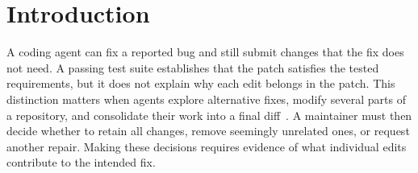 \documentclass[a4paper,fleqn]{cas-sc}
\newcommand{\dsl}{\textsc{Shift-Intent}}
\begin{document}







\section{Introduction}\label{sec:introduction}

A coding agent can fix a reported bug and still submit changes that the fix does not need. A passing test suite establishes that the patch satisfies the tested requirements, but it does not explain why each edit belongs in the patch. This distinction matters when agents explore alternative fixes, modify several parts of a repository, and consolidate their work into a final diff~\citep{yang2024sweagent,bouzenia2025trajectories,mathai2026trim}. A maintainer must then decide whether to retain all changes, remove seemingly unrelated ones, or request another repair. Making these decisions requires evidence of what individual edits contribute to the intended fix.
\end{document}
